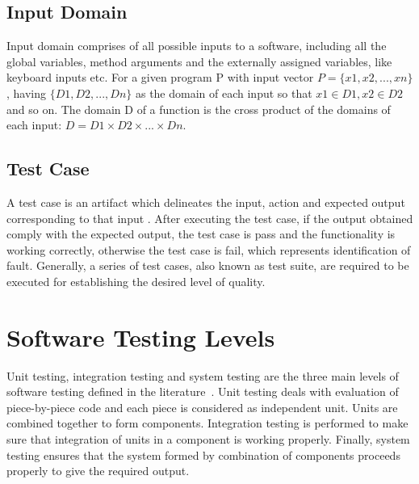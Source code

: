 \subsection{Input Domain} 
Input domain comprises of all possible inputs to a software, including all the global variables, method arguments and the externally assigned variables, like keyboard inputs etc. For a given program P with input vector $ P =\{x1, x2, . . . , xn\}$, having $\{D1, D2, . . . , Dn\}$ as the domain of each input so that $x1 \in D1, x2 \in D2$ and so on. The domain D of a function is the cross product of the domains of each input: $D = D1 \times D2 \times . . . \times Dn$.

\subsection{Test Case}
A test case is an artifact which delineates the input, action and expected output corresponding to that input \cite{ahmed2010software}. After executing the test case, if the output obtained comply with the expected output, the test case is pass and the functionality is working correctly, otherwise the test case is fail, which represents identification of fault. Generally, a series of test cases, also known as test suite, are required to be executed for establishing the desired level of quality.

\section{Software Testing Levels}
Unit testing, integration testing and system testing are the three main levels of software testing defined in the literature~\cite{chilenski1994applicability}. Unit testing deals with evaluation of piece-by-piece code and each piece is considered as independent unit. Units are combined together to form components. Integration testing is performed to make sure that integration of units in a component is working properly. Finally, system testing ensures that the system formed by combination of components proceeds properly to give the required output.


